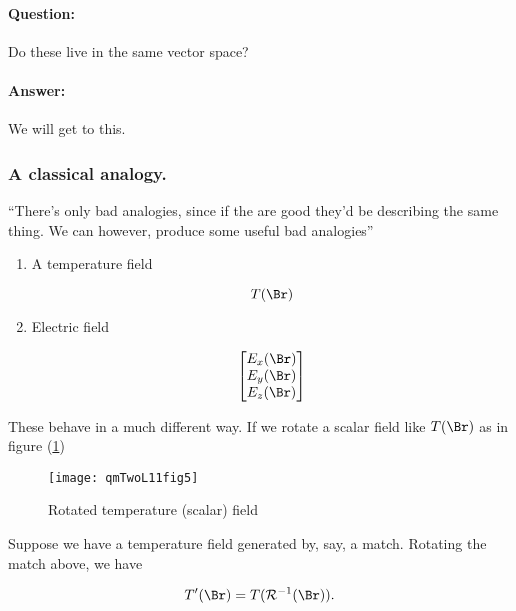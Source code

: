 \paragraph{Question:} Do these live in the same vector space?
\paragraph{Answer:} We will get to this.

\subsubsection{A classical analogy.}

``There's only bad analogies, since if the are good they'd be describing the same thing.  We can however, produce some useful bad analogies''

\begin{enumerate}
\item A temperature field

\begin{equation}\label{eqn:qmTwoL11:590}
T(\Br)
\end{equation}

\item Electric field

\begin{equation}\label{eqn:qmTwoL11:610}
\begin{bmatrix}
E_x(\Br) \\
E_y(\Br) \\
E_z(\Br) 
\end{bmatrix}
\end{equation}

\end{enumerate}

These behave in a much different way.  If we rotate a scalar field like $T(\Br)$ as in figure (\ref{fig:qmTwoL11:qmTwoL11fig5})
\begin{figure}[htp]
   \centering
   \texttt{[image: qmTwoL11fig5]}
   \caption{Rotated temperature (scalar) field}\label{fig:qmTwoL11:qmTwoL11fig5}
\end{figure}

Suppose we have a temperature field generated by, say, a match.  Rotating the match above, we have

\begin{equation}\label{eqn:qmTwoL11:630}
T'(\Br) = T(\mathcal{R}^{-1}(\Br)).
\end{equation}

